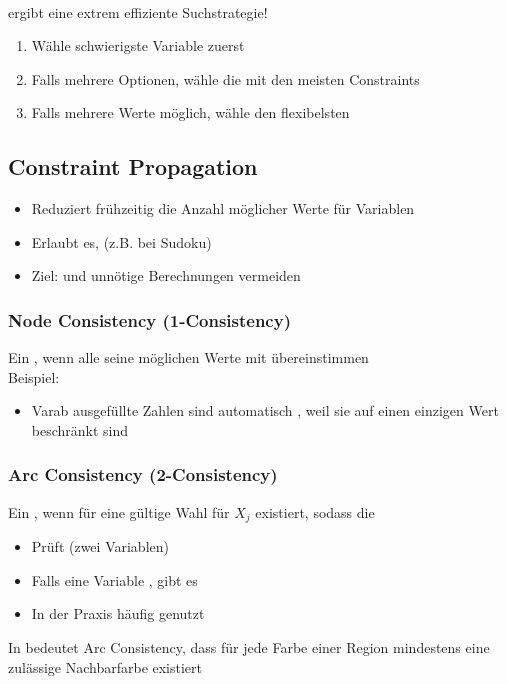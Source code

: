 \\
 ergibt eine extrem effiziente Suchstrategie!
\begin{enumerate}
    \item {} Wähle schwierigste Variable zuerst
    \item {} Falls mehrere Optionen, wähle die mit den meisten Constraints
    \item {} Falls mehrere Werte möglich, wähle den flexibelsten
\end{enumerate}
\subsection{Constraint Propagation}
\begin{itemize}
    \item Reduziert frühzeitig die Anzahl möglicher Werte für Variablen
    \item Erlaubt es,  (z.B. bei Sudoku)
    \item Ziel:  und unnötige Berechnungen vermeiden
\end{itemize}
\subsubsection*{Node Consistency (1-Consistency)}
Ein , wenn alle seine möglichen Werte mit  übereinstimmen\\
Beispiel: 
\begin{itemize}
    \item Varab ausgefüllte Zahlen sind automatisch , weil sie auf einen einzigen Wert beschränkt sind
\end{itemize}
\subsubsection*{Arc Consistency (2-Consistency)}
Ein , wenn für  eine gültige Wahl für $X_{j}$ existiert, sodass die 
\begin{itemize}
    \item Prüft  (zwei Variablen)
    \item Falls eine Variable , gibt es 
    \item In der Praxis häufig genutzt
\end{itemize}
 In  bedeutet Arc Consistency, dass für jede Farbe einer Region mindestens eine zulässige Nachbarfarbe existiert
